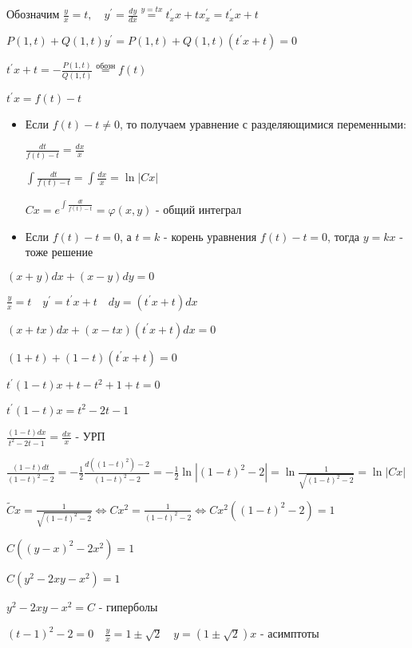 \documentclass[12pt]{article}
\begin{document}
    Обозначим $\frac{y}{x} = t, \quad y^\prime = \frac{dy}{dx} \stackrel{y = tx}{=} t^\prime_x x + t x^\prime_x = t^\prime_x x + t$

    $P(1, t) + Q(1, t)y^\prime = P(1, t) + Q(1, t)(t^\prime x + t) = 0$

    $t^\prime x + t = -\frac{P(1, t)}{Q(1, t)} \stackrel{\text{обозн}}{=} f(t)$

    $t^\prime x = f(t) - t$

    \begin{itemize}
        \item Если $f(t) - t \neq 0$, то получаем уравнение с разделяющимися переменными:

        $\frac{dt}{f(t) - t} = \frac{dx}{x}$

        $\int\frac{dt}{f(t) - t} = \int\frac{dx}{x} = \ln|Cx|$

        $Cx = e^{\int\frac{dt}{f(t) - t}} = \varphi(x, y)$ - общий интеграл

        \item Если $f(t) - t = 0$, а $t = k$ - корень уравнения $f(t) - t = 0$, тогда $y = kx$ - тоже решение
    \end{itemize}

    \Ex $(x + y)dx + (x - y)dy = 0$

    $\frac{y}{x} = t \quad y^\prime = t^\prime x + t \quad dy = (t^\prime x + t)dx$

    $(x + tx)dx + (x - tx)(t^\prime x + t)dx = 0$

    $(1 + t) + (1 - t)(t^\prime x + t) = 0$

    $t^\prime (1 - t) x + t - t^2 + 1 + t = 0$

    $t^\prime (1 - t) x = t^2 - 2t - 1$

    $\frac{(1 - t) dx}{t^2 - 2t - 1} = \frac{dx}{x}$ - УРП

    $\frac{(1 - t)dt}{(1 - t)^2 - 2} = -\frac{1}{2}\frac{d((1 - t)^2) - 2}{(1 - t)^2 - 2} = -\frac{1}{2}\ln|(1 - t)^2 - 2| = \ln\frac{1}{\sqrt{(1 - t)^2 - 2}} = \ln|Cx|$

    $\tilde{C}x = \frac{1}{\sqrt{(1 - t)^2 - 2}} \Longleftrightarrow Cx^2 = \frac{1}{(1 - t)^2 - 2} \Longleftrightarrow Cx^2 ((1 - t)^2 - 2) = 1$

    $C ((y - x)^2 - 2x^2) = 1$

    $C (y^2 - 2xy - x^2) = 1$

    $y^2 - 2xy - x^2 = C$ - гиперболы

    $(t - 1)^2 - 2 = 0 \quad \frac{y}{x} = 1 \pm \sqrt{2} \quad y = (1 \pm \sqrt{2})x$ - асимптоты
\end{document}
